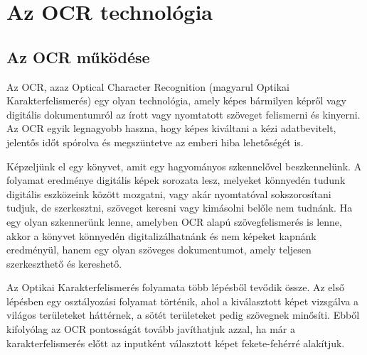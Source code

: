 \documentclass[12pt]{report}
\begin{document}
\chapter{Az OCR technológia}
\section{Az OCR működése}

Az OCR, azaz Optical Character Recognition (magyarul Optikai Karakterfelismerés) egy olyan technológia, amely képes bármilyen képről vagy digitális dokumentumról az írott vagy nyomtatott szöveget felismerni és kinyerni. Az OCR egyik legnagyobb haszna, hogy képes kiváltani a kézi adatbevitelt, jelentős időt spórolva és megszüntetve az emberi hiba lehetőségét is.

\newline
Képzeljünk el egy könyvet, amit egy hagyományos szkennelővel beszkennelünk. A folyamat eredménye digitális képek sorozata lesz, melyeket könnyedén tudunk digitális eszközeink között mozgatni, vagy akár nyomtatóval sokszorosítani tudjuk, de szerkesztni, szöveget keresni vagy kimásolni belőle nem tudnánk. Ha egy olyan szkennerünk lenne, amelyben OCR alapú szövegfelismerés is lenne, akkor a könyvet könnyedén digitalizálhatnánk és nem képeket kapnánk eredményül, hanem egy olyan szöveges dokumentumot, amely teljesen szerkeszthető és kereshető.

\newline
Az Optikai Karakterfelismerés folyamata több lépésből tevődik össze.
Az első lépésben egy osztályozási folyamat történik, ahol a kiválasztott képet vizsgálva a világos területeket háttérnek, a sötét területeket pedig szövegnek minősíti. Ebből kifolyólag az OCR pontosságát tovább javíthatjuk azzal, ha már a karakterfelismerés előtt az inputként választott képet fekete-fehérré alakítjuk.
\end{document}
